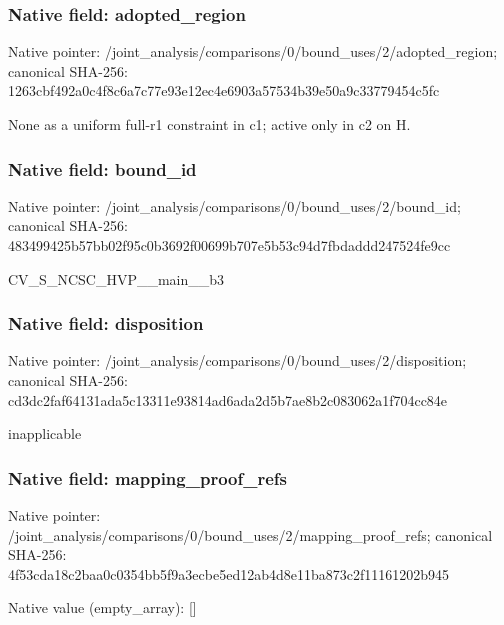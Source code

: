 \documentclass[10pt,a4paper]{article}
\begin{document}
\subsubsection{Native field: adopted\_\allowbreak{}region}
Native pointer: /joint\_\allowbreak{}analysis/comparisons/0/bound\_\allowbreak{}uses/2/adopted\_\allowbreak{}region; canonical SHA-256: 1263cbf492a0c4f8c6a7c77e93e12ec4e6903a57534b39e50a9c33779454c5fc

\begingroup\raggedright\sloppy None as a uniform full-r1 constraint in c1;\allowbreak{} active only in c2 on H.\par\endgroup

\subsubsection{Native field: bound\_\allowbreak{}id}
Native pointer: /joint\_\allowbreak{}analysis/comparisons/0/bound\_\allowbreak{}uses/2/bound\_\allowbreak{}id; canonical SHA-256: 483499425b57bb02f95c0b3692f00699b707e5b53c94d7fbdaddd247524fe9cc

\begingroup\raggedright\sloppy CV\_\allowbreak{}S\_\allowbreak{}NCSC\_\allowbreak{}HVP\_\allowbreak{}\_\allowbreak{}main\_\allowbreak{}\_\allowbreak{}b3\par\endgroup

\subsubsection{Native field: disposition}
Native pointer: /joint\_\allowbreak{}analysis/comparisons/0/bound\_\allowbreak{}uses/2/disposition; canonical SHA-256: cd3dc2faf64131ada5c13311e93814ad6ada2d5b7ae8b2c083062a1f704cc84e

\begingroup\raggedright\sloppy inapplicable\par\endgroup

\subsubsection{Native field: mapping\_\allowbreak{}proof\_\allowbreak{}refs}
Native pointer: /joint\_\allowbreak{}analysis/comparisons/0/bound\_\allowbreak{}uses/2/mapping\_\allowbreak{}proof\_\allowbreak{}refs; canonical SHA-256: 4f53cda18c2baa0c0354bb5f9a3ecbe5ed12ab4d8e11ba873c2f11161202b945

Native value (empty\_\allowbreak{}array): []
\end{document}
